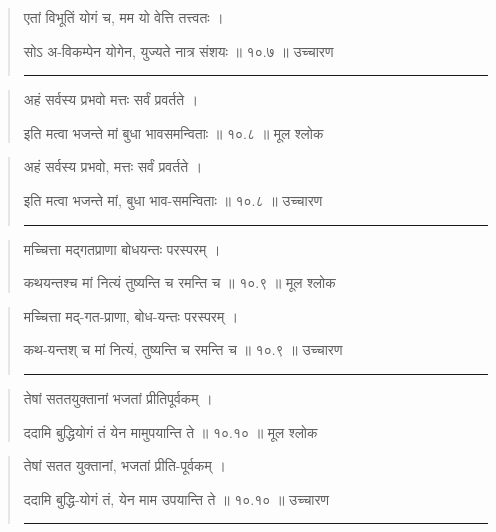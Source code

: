 \begin{quotation}

एतां विभूतिं योगं च, मम यो वेत्ति तत्त्वतः  ।  

सोऽ अ-विकम्पेन योगेन, युज्यते नात्र संशयः  ॥ १०.७ ॥  उच्चारण

\noindent\rule{16cm}{0.4pt} 
\end{quotation}


\begin{quotation} 

अहं सर्वस्य प्रभवो मत्तः सर्वं प्रवर्तते  ।  

इति मत्वा भजन्ते मां बुधा भावसमन्विताः  ॥ १०.८ ॥  मूल श्लोक
\end{quotation}

\begin{quotation}

अहं सर्वस्य प्रभवो, मत्तः सर्वं प्रवर्तते  ।  

इति मत्वा भजन्ते मां, बुधा भाव-समन्विताः  ॥ १०.८ ॥  उच्चारण

\noindent\rule{16cm}{0.4pt} 
\end{quotation}


\begin{quotation} 

मच्चित्ता मद्गतप्राणा बोधयन्तः परस्परम्‌  ।  

कथयन्तश्च मां नित्यं तुष्यन्ति च रमन्ति च  ॥ १०.९ ॥  मूल श्लोक
\end{quotation}

\begin{quotation}

मच्चित्ता मद्-गत-प्राणा, बोध-यन्तः परस्परम्‌  ।  

कथ-यन्तश् च मां नित्यं, तुष्यन्ति च रमन्ति च  ॥ १०.९ ॥  उच्चारण

\noindent\rule{16cm}{0.4pt} 
\end{quotation}


\begin{quotation} 

तेषां सततयुक्तानां भजतां प्रीतिपूर्वकम्‌  ।  

ददामि बुद्धियोगं तं येन मामुपयान्ति ते  ॥ १०.१० ॥  मूल श्लोक
\end{quotation}

\begin{quotation}

तेषां सतत युक्तानां, भजतां प्रीति-पूर्वकम्‌  ।  

ददामि बुद्धि-योगं तं, येन माम उपयान्ति ते  ॥ १०.१० ॥  उच्चारण

\noindent\rule{16cm}{0.4pt} 
\end{quotation}


